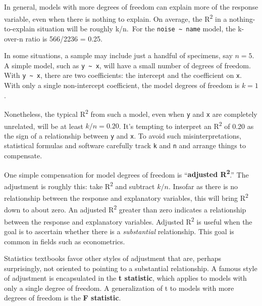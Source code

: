\documentclass[
  letterpaper,
  DIV=11,
  numbers=noendperiod,
  oneside]{scrartcl}
\begin{document}
In general, models with more degrees of freedom can explain more of the
response variable, even when there is nothing to explain. On average,
the R\textsuperscript{2} in a nothing-to-explain situation will be
roughly k/n.~For the \texttt{noise\ \textasciitilde{}\ name} model, the
k-over-n ratio is 566/2236 = 0.25.

\begin{tcolorbox}[enhanced jigsaw, colbacktitle=quarto-callout-note-color!10!white, opacityback=0, breakable, opacitybacktitle=0.6, colback=white, coltitle=black, arc=.35mm, title=\textcolor{quarto-callout-note-color}{\faInfo}\hspace{0.5em}{Small data}, left=2mm, colframe=quarto-callout-note-color-frame, rightrule=.15mm, bottomrule=.15mm, leftrule=.75mm, bottomtitle=1mm, toptitle=1mm, titlerule=0mm, toprule=.15mm]

In some situations, a sample may include just a handful of specimens,
say \(n=5\). A simple model, such as \texttt{y\ \textasciitilde{}\ x},
will have a small number of degrees of freedom. With
\texttt{y\ \textasciitilde{}\ x}, there are two coefficients: the
intercept and the coefficient on \texttt{x}. With only a single
non-intercept coefficient, the model degrees of freedom is \(k=1\).

Nonetheless, the typical R\textsuperscript{2} from such a model, even
when \texttt{y} and \texttt{x} are completely unrelated, will be at
least \(k/n = 0.20\). It's tempting to interpret an R\textsuperscript{2}
of 0.20 as the sign of a relationship between \texttt{y} and \texttt{x}.
To avoid such misinterpretations, statistical formulas and software
carefully track \texttt{k} and \texttt{n} and arrange things to
compensate.

\end{tcolorbox}

One simple compensation for model degrees of freedom is
``\textbf{adjusted R\textsuperscript{2}}.'' The adjustment is roughly
this: take R\textsuperscript{2} and subtract \(k/n\). Insofar as there
is no relationship between the response and explanatory variables, this
will bring R\textsuperscript{2} down to about zero. An adjusted
R\textsuperscript{2} greater than zero indicates a relationship between
the response and explanatory variables. Adjusted R\textsuperscript{2} is
useful when the goal is to ascertain whether there is a
\emph{substantial} relationship. This goal is common in fields such as
econometrics.

Statistics textbooks favor other styles of adjustment that are, perhaps
surprisingly, not oriented to pointing to a substantial relationship. A
famous style of adjustment is encapsulated in the \textbf{t statistic},
which applies to models with only a single degree of freedom. A
generalization of t to models with more degrees of freedom is the
\textbf{F statistic}.
\end{document}
